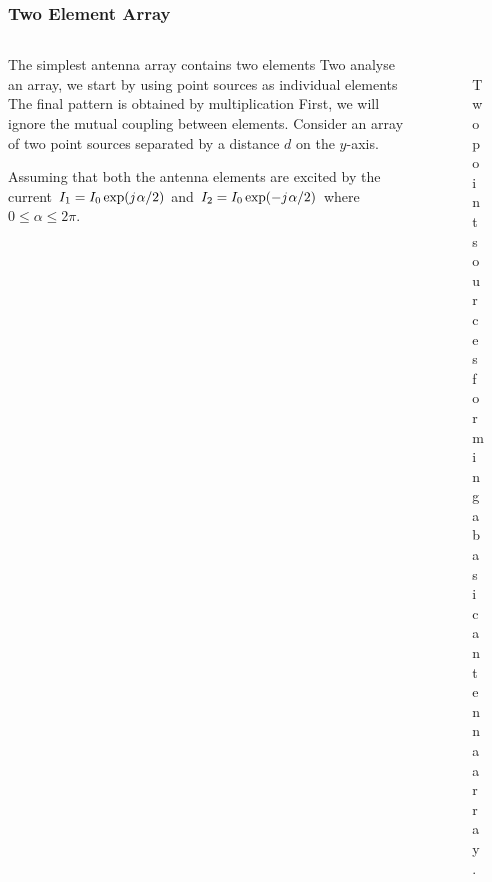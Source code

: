 \documentclass[10pt]{beamer}
\renewcommand{\j}{{j}\mkern1mu} %
\begin{document}
\begin{frame}
    \frametitle{Two Element Array}
    \begin{columns}[T] %
        \begin{column}{.6\textwidth}
            \begin{outline}
                \1 The simplest antenna array contains two elements
                \1 Two analyse an array, we start by using point sources as individual elements
                \2 The final pattern is obtained by multiplication
                \1 First, we will ignore the mutual coupling between elements.
                \1 Consider an array of two point sources separated by a distance $d$ on the $y$-axis.
            \end{outline}
            \begin{outline}
                \1 Assuming that both the antenna elements are excited by the current $I_1 = I_0 \exp (\j \alpha/2)$ and $I_2 = I_0 \exp (-\j \alpha/2)$ where $0 \le \alpha \le 2 \pi$.
            \end{outline}   
        \end{column}
        \begin{column}{.4\textwidth}
            \begin{figure}[T!]
                \centering
                \includegraphics[width=.8\textwidth]{two_elements.pdf}
                \caption{Two point sources forming a basic antenna array.}
            \end{figure}

        \end{column}%
    \end{columns}
\end{frame}
\end{document}
